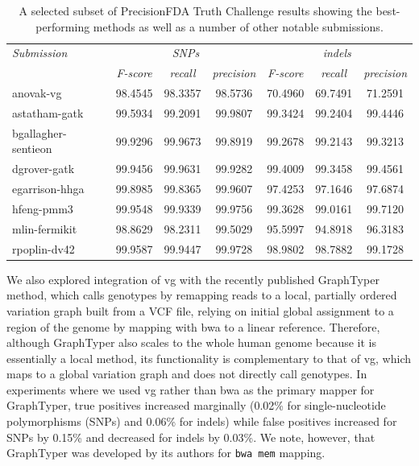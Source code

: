 \begin{table}[h]
\begin{tabular}{l||ccc|ccc}
\itshape Submission & \multicolumn{3}{c}{\itshape SNPs} & \multicolumn{3}{c}{\itshape indels}\\
& \itshape F-score & \itshape recall & \itshape precision & \itshape F-score & \itshape recall & \itshape precision \\
\hline
anovak-vg & 98.4545 & 98.3357 & 98.5736 & 70.4960 & 69.7491 & 71.2591 \\
astatham-gatk & 99.5934 & 99.2091 & 99.9807 & 99.3424 & 99.2404 & 99.4446 \\
bgallagher-sentieon & 99.9296 & 99.9673 & 99.8919 & 99.2678 & 99.2143 & 99.3213 \\
dgrover-gatk & 99.9456 & 99.9631 & 99.9282 & 99.4009 & 99.3458 & 99.4561 \\
egarrison-hhga & 99.8985 & 99.8365 & 99.9607 & 97.4253 & 97.1646 & 97.6874 \\
hfeng-pmm3 & 99.9548 & 99.9339 & 99.9756 & 99.3628 & 99.0161 & 99.7120 \\
mlin-fermikit & 98.8629 & 98.2311 & 99.5029 & 95.5997 & 94.8918 & 96.3183 \\
rpoplin-dv42 & 99.9587 & 99.9447 & 99.9728 & 98.9802 & 98.7882 & 99.1728 \\
\hline
\end{tabular}
\caption[Selected results from the PrecisionFDA Truth Challenge]{A selected subset of PrecisionFDA Truth Challenge results showing the best-performing methods as well as a number of other notable submissions.}
\label{table:PFDA}
\end{table}

We also explored integration of vg with the recently published GraphTyper \cite{eggertsson2017graphtyper} method, which calls genotypes by remapping reads to a local, partially ordered variation graph built from a VCF file, relying on initial global assignment to a region of the genome by mapping with bwa to a linear reference.
Therefore, although GraphTyper also scales to the whole human genome because it is essentially a local method, its functionality is complementary to that of vg, which maps to a global variation graph and does not directly call genotypes.
In experiments where we used vg rather than bwa as the primary mapper for GraphTyper, true positives increased marginally (0.02\% for single-nucleotide polymorphisms (SNPs) and 0.06\% for indels) while false positives increased for SNPs by 0.15\% and decreased for indels by 0.03\%.
We note, however, that GraphTyper was developed by its authors for {\tt bwa mem} mapping.

